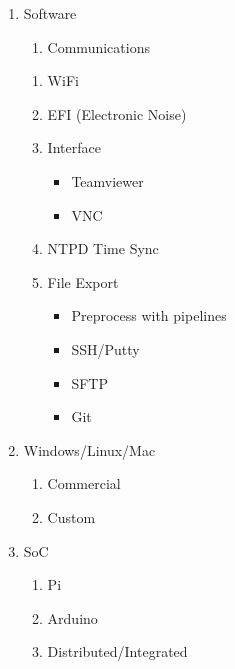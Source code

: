 \documentclass[letter,11pt,oneside]{article}
\begin{document}
\vspace{-.15cm}
\begin{enumerate}\addtolength{\itemsep}{-0.5\baselineskip}
\setcounter{enumi}{5}
   \item  Software
\vspace{-.15cm}
\begin{enumerate}\addtolength{\itemsep}{-0.5\baselineskip}
   \item   Communications
\end{enumerate}

\vspace{-.15cm}
\begin{enumerate}\addtolength{\itemsep}{-0.5\baselineskip}
   \item   WiFi
   \item   EFI (Electronic Noise)
   \item   Interface
\begin{itemize}
\addtolength{\itemsep}{-0.5\baselineskip}
   \item   Teamviewer
   \item   VNC
\end{itemize}

   \item   NTPD Time Sync
   \item   File Export
\begin{itemize}
\addtolength{\itemsep}{-0.5\baselineskip}
   \item   Preprocess with pipelines
   \item   SSH/Putty
   \item   SFTP
   \item   Git
\end{itemize}
\end{enumerate}

   \item   Windows/Linux/Mac
\vspace{-.15cm}
\begin{enumerate}\addtolength{\itemsep}{-0.5\baselineskip}
   \item   Commercial
   \item   Custom
\end{enumerate}

   \item   SoC
\vspace{-.15cm}
\begin{enumerate}\addtolength{\itemsep}{-0.5\baselineskip}
   \item   Pi
   \item   Arduino
   \item   Distributed/Integrated
\end{enumerate}


\end{enumerate}
\end{document}
